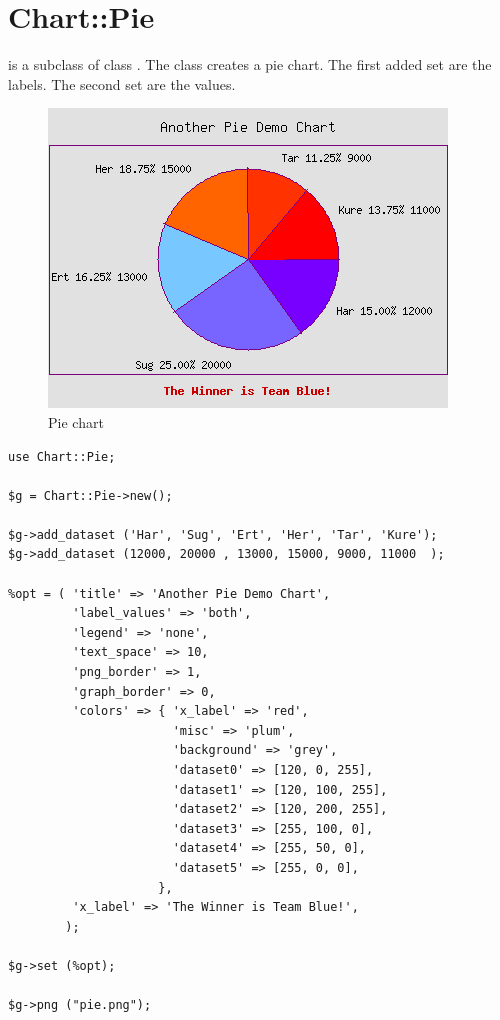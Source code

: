 %
%
\section{Chart::Pie}
\begin{Description} 
 is a subclass of class .
The class  creates a pie chart. The first added set are the labels. 
The second set are the values.
\end{Description}


\begin{figure}[h]
	\begin{center}
		\includegraphics[scale = 0.6]{d_pie3.png}
	\end{center}
	\caption{Pie chart}
	\label{fig:pie}
\end{figure}
\begin{verbatim}
use Chart::Pie;

$g = Chart::Pie->new();

$g->add_dataset ('Har', 'Sug', 'Ert', 'Her', 'Tar', 'Kure');
$g->add_dataset (12000, 20000 , 13000, 15000, 9000, 11000  );

%opt = ( 'title' => 'Another Pie Demo Chart',
         'label_values' => 'both',
         'legend' => 'none',
         'text_space' => 10,
         'png_border' => 1,
         'graph_border' => 0,
         'colors' => { 'x_label' => 'red',
                       'misc' => 'plum',
                       'background' => 'grey',
                       'dataset0' => [120, 0, 255],
                       'dataset1' => [120, 100, 255],
                       'dataset2' => [120, 200, 255],
                       'dataset3' => [255, 100, 0],
                       'dataset4' => [255, 50, 0],
                       'dataset5' => [255, 0, 0],
                     },
         'x_label' => 'The Winner is Team Blue!',
        );

$g->set (%opt);

$g->png ("pie.png");
\end{verbatim}

